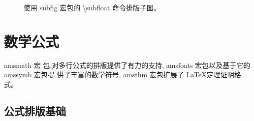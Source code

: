 \documentclass[a4paper]{ctexart}
\begin{document}
    \begin{figure}[htbp]
        \centering
        \qquad
        \caption{使用 subfig 宏包的 \textbackslash subfloat 命令排版子图。}
    \end{figure}
    \section{数学公式}
    amsmath 宏 包,对多行公式的排版提供了有力的支持,%
    amsfonts 宏包以及基于它的 amssymb 宏包提 供了丰富的数学符号,%
    amsthm 宏包扩展了 \LaTeX 定理证明格式。\par
    \subsection{公式排版基础}
\end{document}
